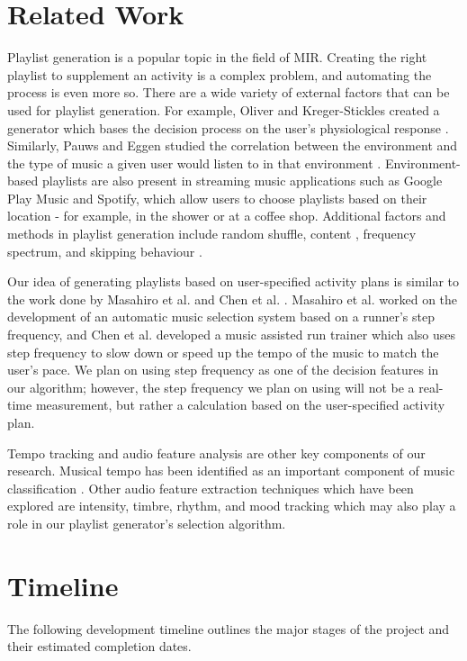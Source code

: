 \documentclass{article}
\begin{document}
\section{Related Work}
Playlist generation is a popular topic in the field of MIR. Creating the right playlist to supplement an activity is a complex problem, and automating the process is even more so. There are a wide variety of external factors that can be used for playlist generation. For example, Oliver and Kreger-Stickles created a generator which bases the decision process on the user’s physiological response \cite{Oliver}. Similarly, Pauws and Eggen studied the correlation between the environment and the type of music a given user would listen to in that environment \cite{Pauws}. Environment-based playlists are also present in streaming music applications such as Google Play Music and Spotify, which allow users to choose playlists based on their location - for example, in the shower or at a coffee shop. Additional factors and methods in playlist generation include random shuffle, content \cite{Logan}, frequency spectrum, and skipping behaviour \cite{Pampalk}.

Our idea of generating playlists based on user-specified activity plans is similar to the work done by Masahiro et al. \cite{Masahiro} and Chen et al. \cite{Chen}. Masahiro et al. worked on the development of an automatic music selection system based on a runner’s step frequency, and Chen et al. developed a music assisted run trainer which also uses step frequency to slow down or speed up the tempo of the music to match the user's pace. We plan on using step frequency as one of the decision features in our algorithm; however, the step frequency we plan on using will not be a real-time measurement, but rather a calculation based on the user-specified activity plan.

Tempo tracking and audio feature analysis are other key components of our research. Musical tempo has been identified as an important component of music classification \cite{McKinney} \cite{Pikrakis} \cite{Alonso}. Other audio feature extraction techniques which have been explored are intensity, timbre, rhythm, and mood tracking \cite{Liu} which may also play a role in our playlist generator's selection algorithm.

\section{Timeline}
The following development timeline outlines the major stages of the project and their estimated completion dates.
\end{document}
